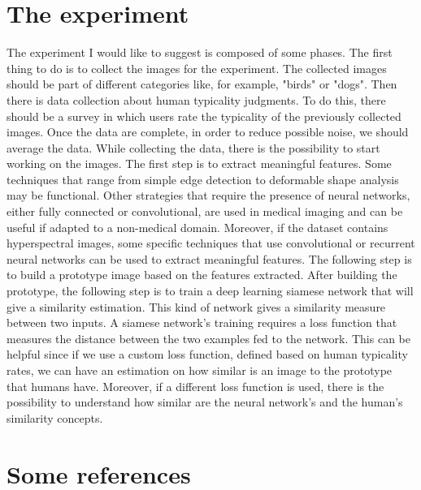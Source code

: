 \documentclass[conference]{IEEEtran}
\begin{document}
\section{The experiment}
The experiment I would like to suggest is composed of some phases. The first thing to do is to collect the images for the experiment. 
The collected images should be part of different categories like, for example, "birds" or "dogs". 
Then there is data collection about human typicality judgments. To do this, there should be a survey in which users rate the typicality of the previously collected images. 
Once the data are complete, in order to reduce possible noise, we should average the data.  
While collecting the data, there is the possibility to start working on the images. 
The first step is to extract meaningful features. 
Some techniques that range from simple edge detection to deformable shape analysis may be functional.
Other strategies that require the presence of neural networks, either fully connected or convolutional, are used in medical imaging and can be useful if adapted to a non-medical domain. 
Moreover, if the dataset contains hyperspectral images, some specific techniques that use convolutional or recurrent neural networks can be used to extract meaningful features. 
The following step is to build a prototype image based on the features extracted.
After building the prototype, the following step is to train a deep learning siamese network that will give a similarity estimation. 
This kind of network gives a similarity measure between two inputs. 
A siamese network's training requires a loss function that measures the distance between the two examples fed to the network. 
This can be helpful since if we use a custom loss function, defined based on human typicality rates, we can have an estimation on how similar is an image to the prototype that humans have. 
Moreover, if a different loss function is used, there is the possibility to understand how similar are the neural network's and the human's similarity concepts.


\section*{Some references}
\end{document}

